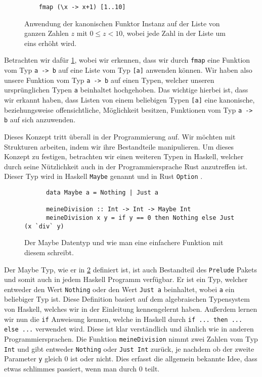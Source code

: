 \documentclass{hhuarticle}
\theoremstyle{definition}
\theoremstyle{theorem}
\begin{document}
  \begin{figure}[h]
    \begin{verbatim}
    fmap (\x -> x+1) [1..10]
    \end{verbatim}
    \caption{Anwendung der kanonischen Funktor Instanz auf der Liste von ganzen Zahlen $z$ mit $0\le z < 10$, wobei jede Zahl in der Liste um eins erhöht wird.}%
    \label{fig:fmapExample}
  \end{figure}

  Betrachten wir dafür \cref{fig:fmapExample}, wobei wir erkennen,
  dass wir durch \verb|fmap| eine Funktion vom Typ \verb|a -> b| auf
  eine Liste vom Typ \verb|[a]| anwenden können. Wir haben also unsere
  Funktion vom Typ \verb|a -> b| auf einen Typen, welcher unseren
  ursprünglichen Typen \verb|a| beinhaltet \glqq hochgehoben\grqq .
  Das wichtige hierbei ist, dass wir erkannt haben, dass Listen von einem
  beliebigen Typen \verb|[a]| eine \glqq kanonische\grqq , beziehungsweise offensichtliche,
  Möglichkeit besitzen, Funktionen vom Typ \verb|a -> b| auf sich anzuwenden.

  Dieses Konzept tritt überall in der Programmierung auf. Wir möchten
  mit Strukturen arbeiten, indem wir ihre Bestandteile manipulieren.
  Um dieses Konzept zu festigen, betrachten wir einen weiteren Typen in
  Haskell, welcher durch seine Nützlichkeit auch in der Programmiersprache
  Rust anzutreffen ist. Dieser Typ wird in Haskell \verb|Maybe| genannt
  und in Rust \verb|Option| \cite{rustOption}.

  \begin{figure}[h]
    \begin{verbatim}
      data Maybe a = Nothing | Just a

      meineDivision :: Int -> Int -> Maybe Int
      meineDivision x y = if y == 0 then Nothing else Just (x `div` y)
    \end{verbatim}
    \caption{Der Maybe Datentyp und wie man eine einfachere Funktion mit diesem schreibt.}%
    \label{fig:maybeType}
  \end{figure}

  Der Maybe Typ, wie er in \cref{fig:maybeType} definiert ist, ist auch
  Bestandteil des \verb|Prelude| Pakets und somit auch in jedem Haskell
  Programm verfügbar. Er ist ein Typ, welcher entweder den Wert \verb|Nothing|
  oder den Wert \verb|Just a| beinhaltet, wobei \verb|a| ein beliebiger Typ ist.
  Diese Definition basiert auf dem algebraischen Typensystem von Haskell,
  welches wir in der Einleitung kennengelernt haben.
  Außerdem lernen wir nun die \verb|if| Anweisung kennen, welche
  in Haskell durch \verb|if ... then ... else ...| verwendet wird.
  Diese ist klar verständlich und ähnlich wie in anderen Programmiersprachen.
  Die Funktion \verb|meineDivision| nimmt zwei Zahlen vom Typ \verb|Int| und
  gibt entweder \verb|Nothing| oder \verb|Just Int| zurück,
  je nachdem ob der zweite Parameter \verb|y| gleich $0$ ist oder nicht.
  Dies erfasst die allgemein bekannte Idee, dass \glqq etwas schlimmes passiert,
  wenn man durch $0$ teilt\grqq .
\end{document}
